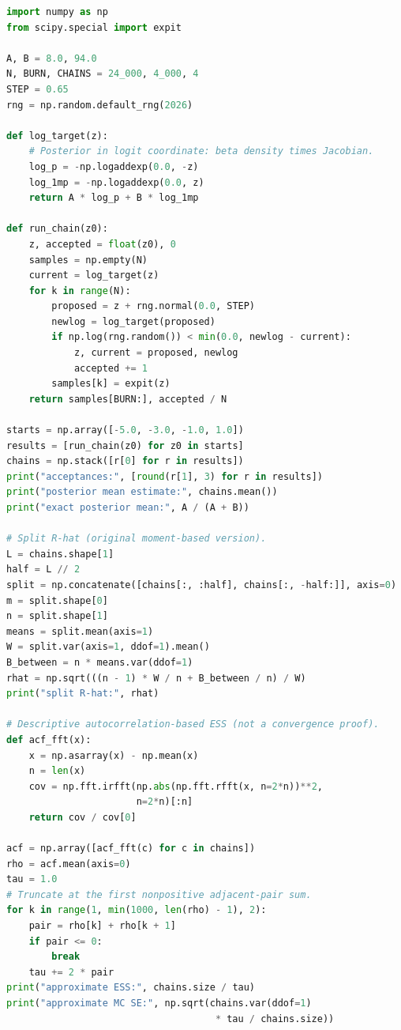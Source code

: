\begin{lstlisting}[language=Python,caption={Kompletny program: cztery łańcuchy Metropolisa--Hastingsa dla posterioru beta, split-R-hat i przybliżony ESS (Python, NumPy i SciPy).}]
import numpy as np
from scipy.special import expit

A, B = 8.0, 94.0
N, BURN, CHAINS = 24_000, 4_000, 4
STEP = 0.65
rng = np.random.default_rng(2026)

def log_target(z):
    # Posterior in logit coordinate: beta density times Jacobian.
    log_p = -np.logaddexp(0.0, -z)
    log_1mp = -np.logaddexp(0.0, z)
    return A * log_p + B * log_1mp

def run_chain(z0):
    z, accepted = float(z0), 0
    samples = np.empty(N)
    current = log_target(z)
    for k in range(N):
        proposed = z + rng.normal(0.0, STEP)
        newlog = log_target(proposed)
        if np.log(rng.random()) < min(0.0, newlog - current):
            z, current = proposed, newlog
            accepted += 1
        samples[k] = expit(z)
    return samples[BURN:], accepted / N

starts = np.array([-5.0, -3.0, -1.0, 1.0])
results = [run_chain(z0) for z0 in starts]
chains = np.stack([r[0] for r in results])
print("acceptances:", [round(r[1], 3) for r in results])
print("posterior mean estimate:", chains.mean())
print("exact posterior mean:", A / (A + B))

# Split R-hat (original moment-based version).
L = chains.shape[1]
half = L // 2
split = np.concatenate([chains[:, :half], chains[:, -half:]], axis=0)
m = split.shape[0]
n = split.shape[1]
means = split.mean(axis=1)
W = split.var(axis=1, ddof=1).mean()
B_between = n * means.var(ddof=1)
rhat = np.sqrt(((n - 1) * W / n + B_between / n) / W)
print("split R-hat:", rhat)

# Descriptive autocorrelation-based ESS (not a convergence proof).
def acf_fft(x):
    x = np.asarray(x) - np.mean(x)
    n = len(x)
    cov = np.fft.irfft(np.abs(np.fft.rfft(x, n=2*n))**2,
                       n=2*n)[:n]
    return cov / cov[0]

acf = np.array([acf_fft(c) for c in chains])
rho = acf.mean(axis=0)
tau = 1.0
# Truncate at the first nonpositive adjacent-pair sum.
for k in range(1, min(1000, len(rho) - 1), 2):
    pair = rho[k] + rho[k + 1]
    if pair <= 0:
        break
    tau += 2 * pair
print("approximate ESS:", chains.size / tau)
print("approximate MC SE:", np.sqrt(chains.var(ddof=1)
                                     * tau / chains.size))
\end{lstlisting}

